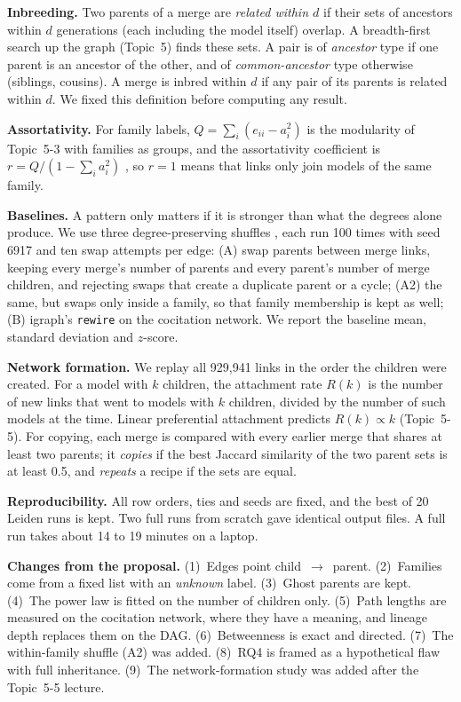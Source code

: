\documentclass[conference]{IEEEtran}
\begin{document}
\textbf{Inbreeding.} Two parents of a merge are \emph{related within $d$} if
their sets of ancestors within $d$ generations (each including the model
itself) overlap. A breadth-first search up the graph (Topic~5) finds these sets.
A pair is of \emph{ancestor} type if one parent is an ancestor of the other, and
of \emph{common-ancestor} type otherwise (siblings, cousins). A merge is
inbred within $d$ if any pair of its parents is related within $d$. We fixed
this definition before computing any result.

\textbf{Assortativity.} For family labels, $Q=\sum_i(e_{ii}-a_i^2)$ is the
modularity of Topic~5-3 with families as groups, and the assortativity
coefficient is $r = Q/(1-\sum_i a_i^2)$ \cite[eq.~7.80]{newman2010}, so $r=1$
means that links only join models of the same family.

\textbf{Baselines.} A pattern only matters if it is stronger than what the
degrees alone produce. We use three degree-preserving shuffles \cite{newman2010},
each run 100 times with seed 6917 and ten swap attempts per edge:
(A) swap parents between merge links, keeping every merge's number of parents
and every parent's number of merge children, and rejecting swaps that create a
duplicate parent or a cycle; (A2) the same, but swaps only inside a family, so
that family membership is kept as well; (B) igraph's \texttt{rewire} on the
cocitation network. We report the baseline mean, standard deviation and
$z$-score.

\textbf{Network formation.} We replay all 929,941 links in the order the
children were created. For a model with $k$ children, the attachment rate
$R(k)$ is the number of new links that went to models with $k$ children,
divided by the number of such models at the time. Linear preferential
attachment predicts $R(k)\propto k$ (Topic~5-5). For copying, each merge is
compared with every earlier merge that shares at least two parents; it
\emph{copies} if the best Jaccard similarity of the two parent sets is at
least 0.5, and \emph{repeats} a recipe if the sets are equal.

\textbf{Reproducibility.} All row orders, ties and seeds are fixed, and the best
of 20 Leiden runs is kept. Two full runs from scratch gave identical output
files. A full run takes about 14 to 19 minutes on a laptop.

\textbf{Changes from the proposal.} (1)~Edges point child~$\to$~parent.
(2)~Families come from a fixed list with an \emph{unknown} label. (3)~Ghost
parents are kept. (4)~The power law is fitted on the number of children only.
(5)~Path lengths are measured on the cocitation network, where they have a
meaning, and lineage depth replaces them on the DAG. (6)~Betweenness is exact
and directed. (7)~The within-family shuffle (A2) was added. (8)~RQ4 is framed as
a hypothetical flaw with full inheritance. (9)~The network-formation study was
added after the Topic~5-5 lecture.
\end{document}
